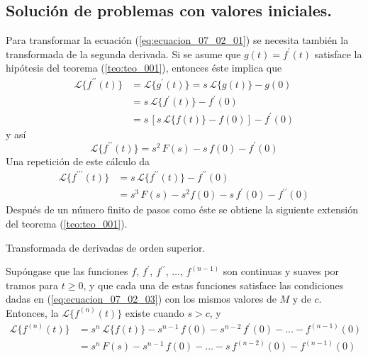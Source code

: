 \subsection*{Solución de problemas con valores iniciales.}
Para transformar la ecuación (\ref{eq:ecuacion_07_02_01}) se necesita también la transformada de la segunda derivada. Si se asume que $g(t) = f^{\prime}(t)$ satisface la hipótesis del teorema (\ref{teo:teo_001}), entonces éste implica que
\begin{align*}
\mathscr{L} \{ f^{\prime \prime} (t) \} &= \mathscr{L} \{ g^{\prime} (t) \} = s \, \mathscr{L}\{ g(t) \} - g(0) \\
&= s \, \mathscr{L}\{ f^{\prime}(t) \} - f^{\prime}(0) \\
&= s \, [ s \, \mathscr{L}\{ f(t) \} - f(0) ] - f^{\prime}(0) \end{align*}
y así
\begin{equation}
\mathscr{L} \{ f^{\prime \prime} (t) \} =  s^{2} \, F(s) - s \, f(0) - f^{\prime}(0)
\label{eq:ecuacion_07_02_05}
\end{equation}
Una repetición de este cálculo da
\begin{align}
\mathscr{L} \{ f^{\prime \prime \prime} (t) \} &= s \, \mathscr{L} \{ f^{\prime \prime} (t) \} - f^{\prime \prime}(0) \nonumber \\
&= s^{3} \, F(s) - s^{2} f(0) - s \, f^{\prime}(0) - f^{\prime \prime}(0)
\label{eq:ecuacion_07_02_06}
\end{align}
Después de un número finito de pasos como éste se obtiene la siguiente extensión del teorema (\ref{teo:teo_001}).
\begin{cor}{Transformada de derivadas de orden superior.}

Supóngase que las funciones $f$, $f^{\prime}$, $f^{\prime \prime}$, $\ldots$, $f^{(n-1)}$ son continuas y suaves por tramos para $t \geq 0$, y que cada una de estas funciones satisface las condiciones dadas en (\ref{eq:ecuacion_07_02_03}) con los mismos valores de $M$ y de $c$. Entonces, la $\mathscr{L} \{ f^{(n)} (t) \}$ existe cuando $s > c$, y
\begin{align*}
\mathscr{L} \{ f^{(n)} (t) \} &= s^{n} \, \mathscr{L} \{ f(t) \} - s^{n-1} \, f(0) - s^{n-2} \, f^{\prime}(0) - \ldots - f^{(n-1)}(0) \\
&= s^{n} \, F(s) - s^{n-1} \, f(0) -  \ldots - s \, f^{(n-2)}(0) - f^{(n-1)}(0)
\label{eq:ecuacion_07_02_07}
\end{align*}
\end{cor}
